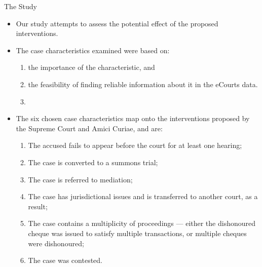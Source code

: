 \documentclass[10pt,aspectratio=169]{beamer}
\begin{document}
\begin{frame}{The Study}
\begin{itemize}
 \item Our study attempts to assess the potential effect of the proposed interventions.
 \item The case characteristics examined were based on: \begin{enumerate}
 \item the importance of the characteristic, and
 \item the feasibility of finding reliable information about it in the eCourts data.
 \item[]
 \end{enumerate} \pause
 \item The six chosen case characteristics map onto the interventions proposed by the Supreme Court and Amici Curiae, and are:

 \begin{enumerate}
 \item The accused fails to appear before the court for at least one hearing;
 \item The case is converted to a summons trial;
 \item The case is referred to mediation;
 \item The case has jurisdictional issues and is transferred to another court, as a result;
 \item The case contains a multiplicity of proceedings --- either the dishonoured cheque was issued to satisfy multiple transactions, or multiple cheques were dishonoured;
 \item The case was contested.
\end{enumerate}
\end{itemize}
\end{frame}
\end{document}
